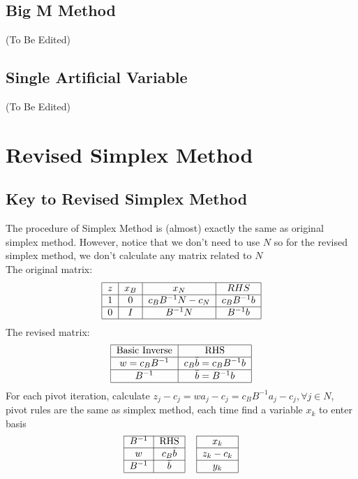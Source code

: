 			\subsection{Big M Method}
				(To Be Edited)
			\subsection{Single Artificial Variable}
				(To Be Edited)

		\section{Revised Simplex Method}
			\subsection{Key to Revised Simplex Method}
				The procedure of Simplex Method is (almost) exactly the same as original simplex method. However, notice that we don't need to use $N$ so for the revised simplex method, we don't calculate any matrix related to $N$\\
				The original matrix:
				\begin{align}
					\begin{tabular} {|c|c|c|c|}
						\hline
						$z$ & $x_B$ & $x_N$ & $RHS$ \\
						\hline
						1 & 0 & $c_BB^{-1}N - c_N$ & $c_BB^{-1}b$ \\
						\hline
						0 & $I$ & $B^{-1}N$ & $B^{-1}b$ \\
						\hline
					\end{tabular} 		
				\end{align}
				The revised matrix:
				\begin{align}
					\begin{tabular} {|c|c|}
						\hline
						Basic Inverse & RHS \\
						\hline
						$w=c_BB^{-1}$ & $c_B\bar{b} = c_BB^{-1}b$\\
						\hline
						$B^{-1}$ & $\bar{b} = B^{-1}b$\\
						\hline
					\end{tabular} 
				\end{align}
				For each pivot iteration, calculate $z_j - c_j = wa_j - c_j = c_BB^{-1}a_j - c_j, \forall j\in N$, pivot rules are the same as simplex method, each time find a variable $x_k$ to enter basis
				\begin{align}
					\begin{tabular}{|c|c|c|c|}
						\cline{1-2} \cline{4-4} $B^{-1}$ & RHS & & $x_k$ \\
						\cline{1-2} \cline{4-4} $w$ & $c_B\bar{b}$ & & $z_k-c_k$ \\
						\cline{1-2} \cline{4-4} $B^{-1}$ & $\bar{b}$ & & $y_k$ \\
						\cline{1-2} \cline{4-4}
					\end{tabular} 
				\end{align}
